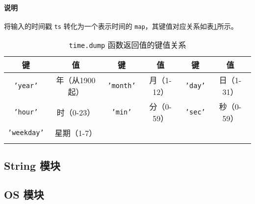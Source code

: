 \paragraph{说明}
将输入的时间戳 \texttt{ts} 转化为一个表示时间的 \texttt{map}，其键值对应关系如表\ref{tab::time_dump_map}所示。
\begin{table}[htb]
    \centering
    \setlength{\tabcolsep}{2mm}
    \begin{tabular}{cccccc} \Xhline{1pt}
        \textbf{键} & \textbf{值} & \textbf{键} & \textbf{值} & \textbf{键} & \textbf{值} \\ \hline
        \texttt{'year'} & 年（从1900起） & \texttt{'month'} & 月（1-12） & \texttt{'day'} & 日（1-31） \\
        \texttt{'hour'} & 时（0-23） & \texttt{'min'} & 分（0-59） & \texttt{'sec'} & 秒（0-59） \\
        \texttt{'weekday'} & 星期（1-7） \\
        \Xhline{1pt}
    \end{tabular}
    \caption{\texttt{time.dump} 函数返回值的键值关系}
    \label{tab::time_dump_map}
\end{table}

\subsection{String 模块}

\subsection{OS 模块}
